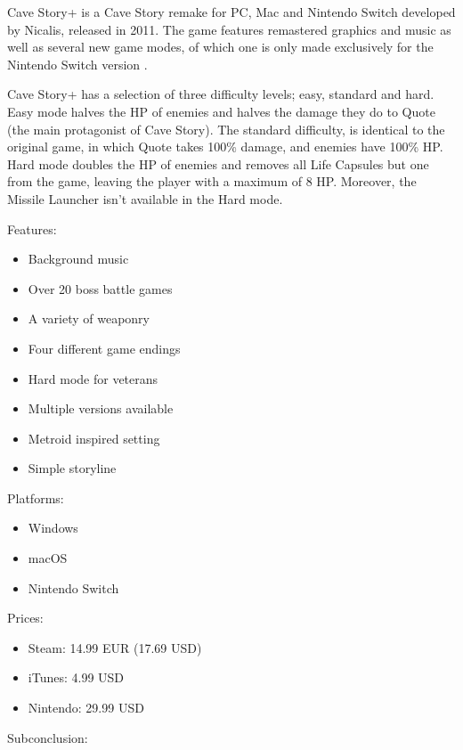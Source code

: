 \documentclass[12p]{article}
\begin{document}
Cave Story+ is a Cave Story remake for PC, Mac and Nintendo Switch developed by Nicalis, released in 2011. The game features remastered graphics and music as well as several new game modes, of which one is only made exclusively for the Nintendo Switch version \cite{CaveStoryPlusWiki}.

Cave Story+ has a selection of three difficulty levels; easy, standard and hard. Easy mode halves the HP of enemies and halves the damage they do to Quote (the main protagonist of Cave Story). The standard difficulty, is identical to the original game, in which Quote takes 100\% damage, and enemies have 100\% HP. Hard mode doubles the HP of enemies and removes all Life Capsules but one from the game, leaving the player with a maximum of 8 HP. Moreover, the Missile Launcher isn't available in the Hard mode.

Features:

\begin{itemize}
  \item Background music
  \item Over 20 boss battle games
  \item A variety of weaponry
  \item Four different game endings
  \item Hard mode for veterans
  \item Multiple versions available
  \item Metroid inspired setting
  \item Simple storyline
\end{itemize}

\newpage

Platforms:

\begin{itemize}
    \item Windows
    \item macOS
    \item Nintendo Switch
\end{itemize}

Prices:

\begin{itemize}
  \item Steam: 14.99 EUR (17.69 USD)
  \item iTunes: 4.99 USD
  \item Nintendo: 29.99 USD
\end{itemize}

Subconclusion:
\end{document}
